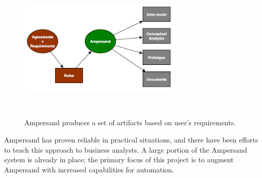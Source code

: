 \documentclass[12pt]{report}
\begin{document}
\begin{figure}
  \centering
    \includegraphics[width=0.7\textwidth]{../figures/ampersand_artifacts}
\caption{Ampersand produces a set of artifacts based on user's requirements.}~\label{fig:figure1}
\end{figure}

Ampersand has proven reliable in practical situations, and there have been
efforts to teach this approach to business analysts. A large portion of the
Ampersand system is already in place; the primary focus of this project is to
augment Ampersand with increased capabilities for automation.
\end{document}
